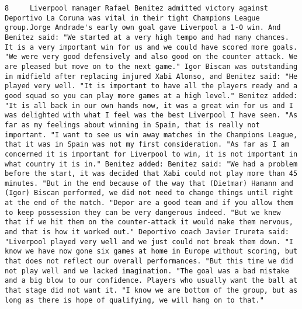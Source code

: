 \documentclass[11pt]{article}
\begin{document}
\begin{Verbatim}[commandchars=\\\{\}]
         8     Liverpool manager Rafael Benitez admitted victory against Deportivo La Coruna was vital in their tight Champions League group.Jorge Andrade's early own goal gave Liverpool a 1-0 win. And Benitez said: "We started at a very high tempo and had many chances. It is a very important win for us and we could have scored more goals. "We were very good defensively and also good on the counter attack. We are pleased but move on to the next game." Igor Biscan was outstanding in midfield after replacing injured Xabi Alonso, and Benitez said: "He played very well. "It is important to have all the players ready and a good squad so you can play more games at a high level." Benitez added: "It is all back in our own hands now, it was a great win for us and I was delighted with what I feel was the best Liverpool I have seen. "As far as my feelings about winning in Spain, that is really not important. "I want to see us win away matches in the Champions League, that it was in Spain was not my first consideration. "As far as I am concerned it is important for Liverpool to win, it is not important in what country it is in." Benitez added: Benitez said: "We had a problem before the start, it was decided that Xabi could not play more than 45 minutes. "But in the end because of the way that (Dietmar) Hamann and (Igor) Biscan performed, we did not need to change things until right at the end of the match. "Depor are a good team and if you allow them to keep possession they can be very dangerous indeed. "But we knew that if we hit them on the counter-attack it would make them nervous, and that is how it worked out." Deportivo coach Javier Irureta said: "Liverpool played very well and we just could not break them down. "I know we have now gone six games at home in Europe without scoring, but that does not reflect our overall performances. "But this time we did not play well and we lacked imagination. "The goal was a bad mistake and a big blow to our confidence. Players who usually want the ball at that stage did not want it. "I know we are bottom of the group, but as long as there is hope of qualifying, we will hang on to that."                                                                                                                                                                                                                                                                                                                                                                                                                                                                                                                                                                                                                                                                                                                                                                                                                                                                                                                                                                                                                                                                                                                                                                                         
\end{Verbatim}
\end{document}
